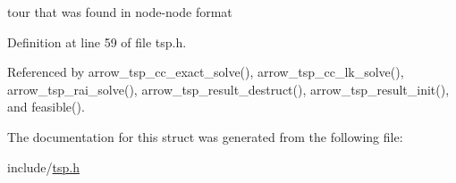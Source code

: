 tour that was found in node-node format 

Definition at line 59 of file tsp.h.

Referenced by arrow\_\-tsp\_\-cc\_\-exact\_\-solve(), arrow\_\-tsp\_\-cc\_\-lk\_\-solve(), arrow\_\-tsp\_\-rai\_\-solve(), arrow\_\-tsp\_\-result\_\-destruct(), arrow\_\-tsp\_\-result\_\-init(), and feasible().

The documentation for this struct was generated from the following file:\begin{CompactItemize}
\item 
include/\hyperlink{tsp_8h}{tsp.h}\end{CompactItemize}
